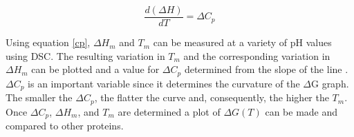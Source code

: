{\begin{equation}\label{cp}
\frac{ d \left ( \Delta H \right ) }{ dT }  = \Delta {C}_{p}
\end{equation}

Using equation \eqref{cp}, $\Delta{H}_{m}$ and ${T}_{m}$ can be measured at a
variety of pH values using DSC.  The resulting variation in ${T}_{m}$ and the
corresponding variation in $\Delta{H}_{m}$ can be plotted and a value for
$\Delta{C}_{p}$ determined from the slope of the line \cite{privalov1979sps}.
$\Delta  {C }_{p }$ is an important variable since it determines the curvature
of the $\Delta$G graph.  The smaller the $\Delta{C}_{p}$, the flatter the curve
and, consequently, the higher the ${T}_{m}$. Once $\Delta{C}_{p}$,
$\Delta{H}_{m}$, and ${T}_{m}$ are determined a plot of $\Delta G \left (  T
\right )$ can be made and compared to other proteins.






}
